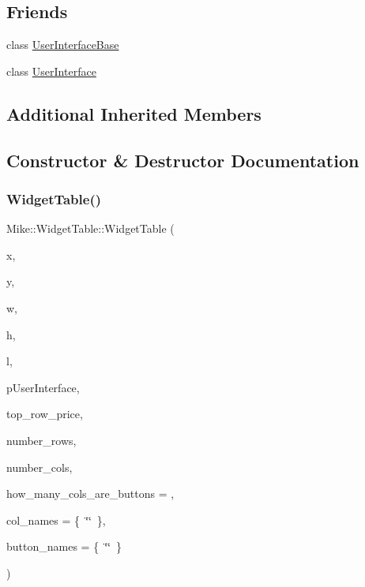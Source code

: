 \subsection*{Friends}
\begin{DoxyCompactItemize}
\item 
class \hyperlink{class_mike_1_1_widget_table_a530ab6298efc8f8abbe63608c9c3e996}{User\+Interface\+Base}
\item 
class \hyperlink{class_mike_1_1_widget_table_adb55a5cf0f8d4b17f324a902a7904d97}{User\+Interface}
\end{DoxyCompactItemize}
\subsection*{Additional Inherited Members}


\subsection{Constructor \& Destructor Documentation}
\mbox{\label{class_mike_1_1_widget_table_a2b409a5c6b7f2f4fd589ac0250fc297d}} 
\subsubsection{\texorpdfstring{Widget\+Table()}{WidgetTable()}\hspace{0.1cm}{\footnotesize\ttfamily [1/3]}}
{\footnotesize\ttfamily Mike\+::\+Widget\+Table\+::\+Widget\+Table (\begin{DoxyParamCaption}\item[{int}]{x,  }\item[{int}]{y,  }\item[{int}]{w,  }\item[{int}]{h,  }\item[{const char $\ast$}]{l,  }\item[{\hyperlink{class_mike_1_1_user_interface_base}{User\+Interface\+Base} $\ast$}]{p\+User\+Interface,  }\item[{int}]{top\+\_\+row\+\_\+price,  }\item[{int}]{number\+\_\+rows,  }\item[{int}]{number\+\_\+cols,  }\item[{int}]{how\+\_\+many\+\_\+cols\+\_\+are\+\_\+buttons = {},  }\item[{std\+::vector$<$ std\+::string $>$}]{col\+\_\+names = {\ttfamily \{~\char`\"{}\char`\"{}~\}},  }\item[{std\+::vector$<$ std\+::string $>$}]{button\+\_\+names = {\ttfamily \{~\char`\"{}\char`\"{}~\}} }\end{DoxyParamCaption})}

